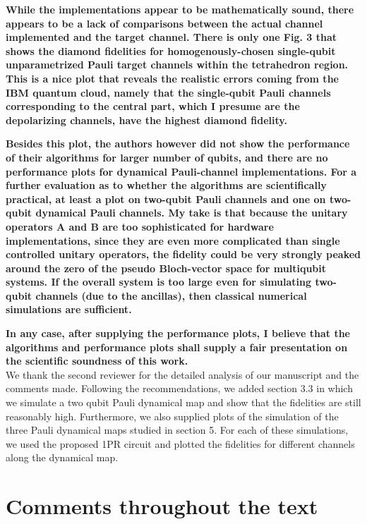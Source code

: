 \documentclass[10pt,letterpaper]{article} %
\begin{document}
\textbf{While the implementations appear to be mathematically sound, there
appears to be a lack of comparisons between the actual channel
implemented and the target channel. There is only one Fig. 3 that
shows the diamond fidelities for homogenously-chosen single-qubit
unparametrized Pauli target channels within the tetrahedron region.
This is a nice plot that reveals the realistic errors coming from the
IBM quantum cloud, namely that the single-qubit Pauli channels
corresponding to the central part, which I presume are the
depolarizing channels, have the highest diamond fidelity.}

\textbf{
Besides this plot, the authors however did not show the performance of
their algorithms for larger number of qubits, and there are no
performance plots for dynamical Pauli-channel implementations. For a
further evaluation as to whether the algorithms are scientifically
practical, at least a plot on two-qubit Pauli channels and one on
two-qubit dynamical Pauli channels. My take is that because the
unitary operators A and B are too sophisticated for hardware
implementations, since they are even more complicated than single
controlled unitary operators, the fidelity could be very strongly
peaked around the zero of the pseudo Bloch-vector space for multiqubit
systems. If the overall system is too large even for simulating
two-qubit channels (due to the ancillas), then classical numerical
simulations are sufficient.}

\textbf{
In any case, after supplying the performance plots, I believe that the
algorithms and performance plots shall supply a fair presentation on
the scientific soundness of this work.} \\


We thank the second reviewer for the detailed analysis
of our manuscript and the comments made. 
Following the recommendations, we 
added section 3.3 in which we simulate a two qubit Pauli dynamical map 
and show that the fidelities are still reasonably high. 
Furthermore, we also supplied plots of the simulation of the
three Pauli dynamical maps studied in section 5. 
For each of these simulations, we used the proposed 1PR circuit and plotted the fidelities for
different channels along the dynamical map.



\section*{Comments throughout the text}
\end{document}
